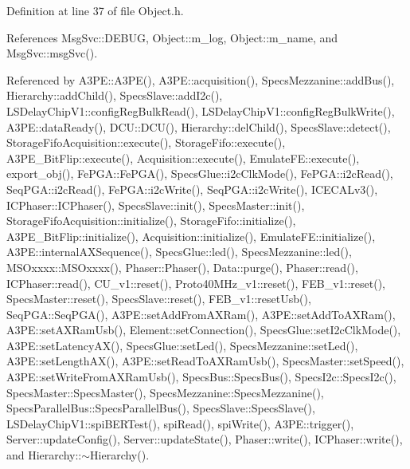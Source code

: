 Definition at line 37 of file Object.\+h.



References Msg\+Svc\+::\+D\+E\+B\+UG, Object\+::m\+\_\+log, Object\+::m\+\_\+name, and Msg\+Svc\+::msg\+Svc().



Referenced by A3\+P\+E\+::\+A3\+P\+E(), A3\+P\+E\+::acquisition(), Specs\+Mezzanine\+::add\+Bus(), Hierarchy\+::add\+Child(), Specs\+Slave\+::add\+I2c(), L\+S\+Delay\+Chip\+V1\+::config\+Reg\+Bulk\+Read(), L\+S\+Delay\+Chip\+V1\+::config\+Reg\+Bulk\+Write(), A3\+P\+E\+::data\+Ready(), D\+C\+U\+::\+D\+C\+U(), Hierarchy\+::del\+Child(), Specs\+Slave\+::detect(), Storage\+Fifo\+Acquisition\+::execute(), Storage\+Fifo\+::execute(), A3\+P\+E\+\_\+\+Bit\+Flip\+::execute(), Acquisition\+::execute(), Emulate\+F\+E\+::execute(), export\+\_\+obj(), Fe\+P\+G\+A\+::\+Fe\+P\+G\+A(), Specs\+Glue\+::i2c\+Clk\+Mode(), Fe\+P\+G\+A\+::i2c\+Read(), Seq\+P\+G\+A\+::i2c\+Read(), Fe\+P\+G\+A\+::i2c\+Write(), Seq\+P\+G\+A\+::i2c\+Write(), I\+C\+E\+C\+A\+Lv3(), I\+C\+Phaser\+::\+I\+C\+Phaser(), Specs\+Slave\+::init(), Specs\+Master\+::init(), Storage\+Fifo\+Acquisition\+::initialize(), Storage\+Fifo\+::initialize(), A3\+P\+E\+\_\+\+Bit\+Flip\+::initialize(), Acquisition\+::initialize(), Emulate\+F\+E\+::initialize(), A3\+P\+E\+::internal\+A\+X\+Sequence(), Specs\+Glue\+::led(), Specs\+Mezzanine\+::led(), M\+S\+Oxxxx\+::\+M\+S\+Oxxxx(), Phaser\+::\+Phaser(), Data\+::purge(), Phaser\+::read(), I\+C\+Phaser\+::read(), C\+U\+\_\+v1\+::reset(), Proto40\+M\+Hz\+\_\+v1\+::reset(), F\+E\+B\+\_\+v1\+::reset(), Specs\+Master\+::reset(), Specs\+Slave\+::reset(), F\+E\+B\+\_\+v1\+::reset\+Usb(), Seq\+P\+G\+A\+::\+Seq\+P\+G\+A(), A3\+P\+E\+::set\+Add\+From\+A\+X\+Ram(), A3\+P\+E\+::set\+Add\+To\+A\+X\+Ram(), A3\+P\+E\+::set\+A\+X\+Ram\+Usb(), Element\+::set\+Connection(), Specs\+Glue\+::set\+I2c\+Clk\+Mode(), A3\+P\+E\+::set\+Latency\+A\+X(), Specs\+Glue\+::set\+Led(), Specs\+Mezzanine\+::set\+Led(), A3\+P\+E\+::set\+Length\+A\+X(), A3\+P\+E\+::set\+Read\+To\+A\+X\+Ram\+Usb(), Specs\+Master\+::set\+Speed(), A3\+P\+E\+::set\+Write\+From\+A\+X\+Ram\+Usb(), Specs\+Bus\+::\+Specs\+Bus(), Specs\+I2c\+::\+Specs\+I2c(), Specs\+Master\+::\+Specs\+Master(), Specs\+Mezzanine\+::\+Specs\+Mezzanine(), Specs\+Parallel\+Bus\+::\+Specs\+Parallel\+Bus(), Specs\+Slave\+::\+Specs\+Slave(), L\+S\+Delay\+Chip\+V1\+::spi\+B\+E\+R\+Test(), spi\+Read(), spi\+Write(), A3\+P\+E\+::trigger(), Server\+::update\+Config(), Server\+::update\+State(), Phaser\+::write(), I\+C\+Phaser\+::write(), and Hierarchy\+::$\sim$\+Hierarchy().



